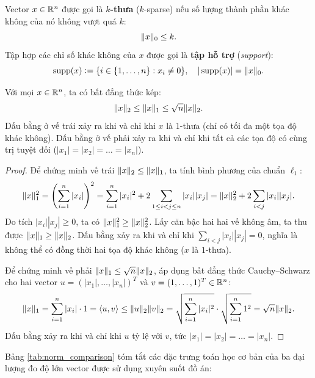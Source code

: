 Vector $x \in \mathbb{R}^n$ được gọi là \textbf{$k$-thưa} ($k$-sparse) nếu số lượng thành phần khác không của nó không vượt quá $k$:
\[
\|x\|_0 \le k.
\]
Tập hợp các chỉ số khác không của $x$ được gọi là \textbf{tập hỗ trợ} (\emph{support}):
\begin{equation}
    \operatorname{supp}(x) \mathrel{\mathop:}= \{i \in \{1, \dots, n\} : x_i \ne 0\}, \quad |\operatorname{supp}(x)| = \|x\|_0.
\end{equation}

\begin{lemma}
Với mọi $x \in \mathbb{R}^n$, ta có bất đẳng thức kép:
\begin{equation}
    \|x\|_2 \le \|x\|_1 \le \sqrt{n} \|x\|_2.
    \label{eq:norm_inequality}
\end{equation}
Dấu bằng ở vế trái xảy ra khi và chỉ khi $x$ là $1$-thưa (chỉ có tối đa một tọa độ khác không). Dấu bằng ở vế phải xảy ra khi và chỉ khi tất cả các tọa độ có cùng trị tuyệt đối ($|x_1| = |x_2| = \dots = |x_n|$).
\end{lemma}

\begin{proof}
Để chứng minh vế trái $\|x\|_2 \le \|x\|_1$, ta tính bình phương của chuẩn $\ell_1$:
\[
\|x\|_1^2 = \left( \sum_{i=1}^n |x_i| \right)^2 = \sum_{i=1}^n |x_i|^2 + 2\sum_{1 \le i < j \le n} |x_i| |x_j| = \|x\|_2^2 + 2\sum_{i < j} |x_i| |x_j|.
\]
Do tích $|x_i| |x_j| \ge 0$, ta có $\|x\|_1^2 \ge \|x\|_2^2$. Lấy căn bậc hai hai vế không âm, ta thu được $\|x\|_1 \ge \|x\|_2$. Dấu bằng xảy ra khi và chỉ khi $\sum_{i < j} |x_i| |x_j| = 0$, nghĩa là không thể có đồng thời hai tọa độ khác không ($x$ là $1$-thưa).

Để chứng minh vế phải $\|x\|_1 \le \sqrt{n} \|x\|_2$, áp dụng bất đẳng thức Cauchy--Schwarz cho hai vector $u = (|x_1|, \dots, |x_n|)^T$ và $v = (1, \dots, 1)^T \in \mathbb{R}^n$:
\[
\|x\|_1 = \sum_{i=1}^n |x_i| \cdot 1 = \langle u, v \rangle \le \|u\|_2 \|v\|_2 = \sqrt{\sum_{i=1}^n |x_i|^2} \cdot \sqrt{\sum_{i=1}^n 1^2} = \sqrt{n} \|x\|_2.
\]
Dấu bằng xảy ra khi và chỉ khi $u$ tỷ lệ với $v$, tức $|x_1| = |x_2| = \dots = |x_n|$.
\end{proof}

Bảng \ref{tab:norm_comparison} tóm tắt các đặc trưng toán học cơ bản của ba đại lượng đo độ lớn vector được sử dụng xuyên suốt đồ án:

